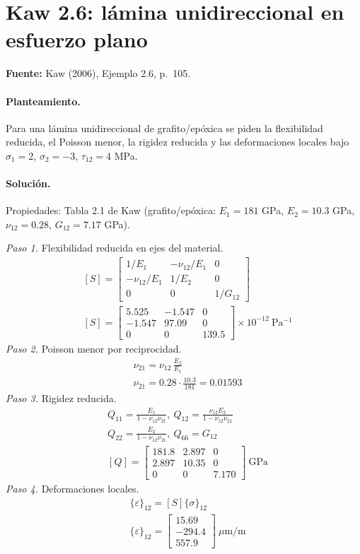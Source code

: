 \documentclass[11pt]{article}
\begin{document}
\clearpage
\section{Kaw 2.6: lámina unidireccional en esfuerzo plano}\label{ej:kaw_2_6}
\textbf{Fuente:} Kaw (2006), Ejemplo 2.6, p.~105.

\paragraph{Planteamiento.} Para una lámina unidireccional de grafito/epóxica se piden la flexibilidad reducida, el Poisson menor, la rigidez reducida y las deformaciones locales bajo $\sigma_1=2$, $\sigma_2=-3$, $\tau_{12}=4$ MPa.

\paragraph{Solución.}
Propiedades: Tabla 2.1 de Kaw (grafito/epóxica: $E_1=181$ GPa, $E_2=10.3$ GPa, $\nu_{12}=0.28$, $G_{12}=7.17$ GPa).

\textit{Paso 1.} Flexibilidad reducida en ejes del material.
\begin{align*}
&[S]=\begin{bmatrix}1/E_1 & -\nu_{12}/E_1 & 0\\ -\nu_{12}/E_1 & 1/E_2 & 0\\ 0&0&1/G_{12}\end{bmatrix} \\
&[S]=\begin{bmatrix}5.525 & -1.547 & 0 \\ -1.547 & 97.09 & 0 \\ 0 & 0 & 139.5\end{bmatrix}\times10^{-12}\ \mathrm{Pa^{-1}}
\end{align*}
\textit{Paso 2.} Poisson menor por reciprocidad.
\begin{align*}
&\nu_{21}=\nu_{12}\,\frac{E_2}{E_1} \\
&\nu_{21}=0.28\cdot\frac{10.3}{181}=0.01593
\end{align*}
\textit{Paso 3.} Rigidez reducida.
\begin{align*}
&Q_{11}=\frac{E_1}{1-\nu_{12}\nu_{21}},\ Q_{12}=\frac{\nu_{12}E_2}{1-\nu_{12}\nu_{21}} \\
&Q_{22}=\frac{E_2}{1-\nu_{12}\nu_{21}},\ Q_{66}=G_{12} \\
&[Q]=\begin{bmatrix}181.8 & 2.897 & 0 \\ 2.897 & 10.35 & 0 \\ 0 & 0 & 7.170\end{bmatrix}\ \mathrm{GPa}
\end{align*}
\textit{Paso 4.} Deformaciones locales.
\begin{align*}
&\{\varepsilon\}_{12}=[S]\{\sigma\}_{12} \\
&\{\varepsilon\}_{12}=\begin{bmatrix}15.69 \\ -294.4 \\ 557.9\end{bmatrix}\ \mu\mathrm{m/m}
\end{align*}
\end{document}
